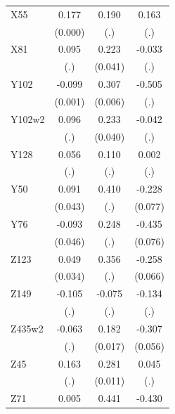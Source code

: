 \begin{table}[htbp]
\begin{tabular}{l*{3}{c}}
X55             &    0.177\sym{***}&    0.190         &    0.163         \\
                &  (0.000)         &      (.)         &      (.)         \\
X81             &    0.095         &    0.223\sym{***}&   -0.033         \\
                &      (.)         &  (0.041)         &      (.)         \\
Y102            &   -0.099\sym{***}&    0.307\sym{***}&   -0.505         \\
                &  (0.001)         &  (0.006)         &      (.)         \\
Y102w2          &    0.096         &    0.233\sym{***}&   -0.042         \\
                &      (.)         &  (0.040)         &      (.)         \\
Y128            &    0.056         &    0.110         &    0.002         \\
                &      (.)         &      (.)         &      (.)         \\
Y50             &    0.091\sym{**} &    0.410         &   -0.228\sym{***}\\
                &  (0.043)         &      (.)         &  (0.077)         \\
Y76             &   -0.093\sym{**} &    0.248         &   -0.435\sym{***}\\
                &  (0.046)         &      (.)         &  (0.076)         \\
Z123            &    0.049         &    0.356         &   -0.258\sym{***}\\
                &  (0.034)         &      (.)         &  (0.066)         \\
Z149            &   -0.105         &   -0.075         &   -0.134         \\
                &      (.)         &      (.)         &      (.)         \\
Z435w2          &   -0.063         &    0.182\sym{***}&   -0.307\sym{***}\\
                &      (.)         &  (0.017)         &  (0.056)         \\
Z45             &    0.163         &    0.281\sym{***}&    0.045         \\
                &      (.)         &  (0.011)         &      (.)         \\
Z71             &    0.005         &    0.441         &   -0.430\sym{***}\\

\end{tabular}
\end{table}
